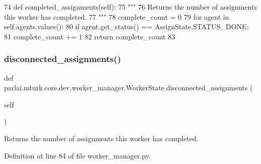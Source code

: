 \begin{DoxyCode}
74     \textcolor{keyword}{def }completed\_assignments(self):
75         \textcolor{stringliteral}{"""}
76 \textcolor{stringliteral}{        Returns the number of assignments this worker has completed.}
77 \textcolor{stringliteral}{        """}
78         complete\_count = 0
79         \textcolor{keywordflow}{for} agent \textcolor{keywordflow}{in} self.agents.values():
80             \textcolor{keywordflow}{if} agent.get\_status() == AssignState.STATUS\_DONE:
81                 complete\_count += 1
82         \textcolor{keywordflow}{return} complete\_count
83 
\end{DoxyCode}
\mbox{\label{classparlai_1_1mturk_1_1core_1_1dev_1_1worker__manager_1_1WorkerState_a484636b6cf7e2bd4772369345d3854fe}} 
\subsubsection{\texorpdfstring{disconnected\+\_\+assignments()}{disconnected\_assignments()}}
{\footnotesize\ttfamily def parlai.\+mturk.\+core.\+dev.\+worker\+\_\+manager.\+Worker\+State.\+disconnected\+\_\+assignments (\begin{DoxyParamCaption}\item[{}]{self }\end{DoxyParamCaption})}

\begin{DoxyVerb}Returns the number of assignments this worker has completed.
\end{DoxyVerb}
 

Definition at line 84 of file worker\+\_\+manager.\+py.


